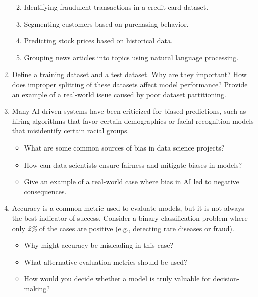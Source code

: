 \documentclass[
  11pt,
]{book}
\providecommand{\tightlist}{%
  \setlength{\itemsep}{0pt}\setlength{\parskip}{0pt}}
\theoremstyle{definition}
\theoremstyle{definition}
\theoremstyle{definition}
\theoremstyle{definition}
\theoremstyle{remark}
\begin{document}
\begin{enumerate}
  \begin{enumerate}
  \def\labelenumii{\alph{enumii}.}
  \tightlist
  \item
    Identifying fraudulent transactions in a credit card dataset.\\
  \item
    Segmenting customers based on purchasing behavior.\\
  \item
    Predicting stock prices based on historical data.\\
  \item
    Grouping news articles into topics using natural language processing.\\
  \end{enumerate}
\item
  Define a training dataset and a test dataset. Why are they important? How does improper splitting of these datasets affect model performance? Provide an example of a real-world issue caused by poor dataset partitioning.\\
\item
  Many AI-driven systems have been criticized for biased predictions, such as hiring algorithms that favor certain demographics or facial recognition models that misidentify certain racial groups.

  \begin{itemize}
  \tightlist
  \item
    What are some common sources of bias in data science projects?\\
  \item
    How can data scientists ensure fairness and mitigate biases in models?\\
  \item
    Give an example of a real-world case where bias in AI led to negative consequences.\\
  \end{itemize}
\item
  Accuracy is a common metric used to evaluate models, but it is not always the best indicator of success. Consider a binary classification problem where only \emph{2\%} of the cases are positive (e.g., detecting rare diseases or fraud).

  \begin{itemize}
  \tightlist
  \item
    Why might accuracy be misleading in this case?\\
  \item
    What alternative evaluation metrics should be used?\\
  \item
    How would you decide whether a model is truly valuable for decision-making?
  \end{itemize}
\end{enumerate}
\end{document}
